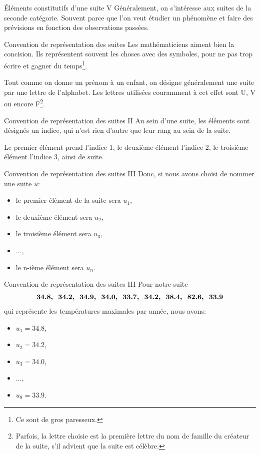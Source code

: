 \documentclass{beamer}
\begin{document}
\begin{frame}{\'{E}léments constitutifs d'une suite V}
  Généralement, on s'intéresse aux suites de la seconde catégorie. Souvent parce que l'on veut étudier un phénomène et faire des prévisions en fonction des observations passées.
\end{frame}

\begin{frame}{Convention de représentation des suites}
Les mathématiciens aiment bien la concision. Ils représentent souvent les choses avec des symboles, pour ne pas trop écrire et gagner du temps\footnote{Ce sont de gros paresseux.}.

Tout comme on donne un prénom à un enfant, on désigne généralement une suite par une lettre de l'alphabet. Les lettres utilisées couramment à cet effet sont U, V ou encore F\footnote{Parfois, la lettre choisie est la première lettre du nom de famille du créateur de la suite, s'il advient que la suite est célèbre.}.
\end{frame}

\begin{frame}{Convention de représentation des suites II}
  Au sein d'une suite, les éléments sont désignés un indice, qui n'est rien d'autre que leur rang au sein de la suite.

  Le premier élément prend l'indice 1, le deuxième élément l'indice 2, le troisième élément l'indice 3, ainsi de suite.
\end{frame}

\begin{frame}{Convention de représentation des suites III}
  Donc, si nous avons choisi de nommer une suite $u$:
  \begin{itemize}
    \item le premier élément de la suite sera $u_1$,
    \item le deuxième élément sera $u_2$,
    \item le troisième élément sera $u_3$,
    \item $\dots$,
    \item le n-ième élément sera $u_n$.
  \end{itemize} 
\end{frame}

\begin{frame}{Convention de représentation des suites III}
  Pour notre suite
  \begin{align*}
    \footnotesize
    \bm{34.8,\ \ 34.2,\ \ 34.9,\ \ 34.0,\ \ 33.7,\ \ 34.2,\ \ 38.4,\ \ 82.6,\ \ 33.9}
  \end{align*}
  qui représente les températures maximales par année, nous avons:
  \begin{itemize}
    \item $u_1 = 34.8$,
    \item $u_2 = 34.2$,
    \item $u_3 = 34.0$,
    \item $\dots$,
    \item $u_9 = 33.9$.
  \end{itemize} 
\end{frame}
\end{document}
